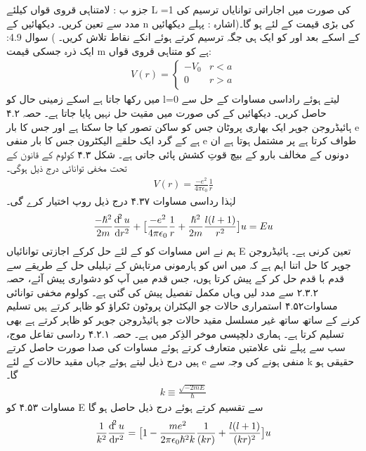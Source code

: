 جزو ب : لامتناہی قروی قواں کیلئے L =1 کی صورت میں اجاراتی توانایاں ترسیم کی مدد سے تعین کریں۔ دیکھائیں کے n کی بڑی قیمت کے لئے 
ہو گا۔(اشارہ : پہلے دیکھائیں کے
اسکے بعد
اور
کو ایک ہی جگہ ترسیم کرتے ہوئے انکے نقاط تلاش کریں۔ )
سوال 4.9: ایک ذرہ جسکی قیمت m ہے کو متناہی قروی قواں:
\begin{align}
V(r)=\begin{cases}-V_{0}&r<a\\0&r>a\\\end{cases} 
\end{align}
میں رکھا جاتا ہے اسکے زمینی حال کو l=0 لیتے ہوئے راداسی مساوات کے حل سے حاصل کریں۔ دیکھائیں کے
کی صورت میں مقیت حل نہیں پایا جاتا ہے۔
حصہ ۴.۲
ہائیڈروجن جوہر ایک بھاری پروٹان جس کو ساکن تصور کیا جا سکتا ہے اور جس کا بار e ہے کے  گرد ایک حلقے الیکٹرون جس کا بار منفی e طواف کرتا ہے پر مشتمل ہوتا ہے ان دونوں کے مخالف بارو کے بیچ قوتِ کشش پائی جاتی ہے۔
 شکل ۴.۳
 کولوم کے قانون کے تحت مخفی توانائی درج ذیل ہوگی۔  
 \begin{align}
V(r)=\frac{-e^{2}}{4\pi\epsilon_{0}}\frac{1}{r} 
\end{align}
لہٰذا رداسی مساوات ۴.۳۷ درج ذیل روپ اختیار کرے گی۔
\begin{align}
\frac{-\hslash^{2}}{2m}\frac{\dif^{2}{u}}{\dif{r^{2}}}+\big[\frac{-e^{2}}{4\pi\epsilon_{0}}\frac{1}{r}+\frac{\hslash^{2}}{2m}\frac{l(l+1)}{r^{2}}\big]u=Eu 
\end{align}
 ہم نے اس مساوات کو 
  کے لئے حل کرکے اجازتی توانائیاں E تعین کرنی ہے۔  ہائیڈروجن جوہر کا حل اتنا اہم ہے کہ میں اس کو ہارمونی مرتاہش کے تہلیلی حل کے طریقے سے قدم با قدم حل کر کے پیش کرتا ہوں، جس قدم میں آپ کو دشواری پیش آئے، حصہ ۲.۳.۲ سے مدد لیں وہاں مکمل تفصیل پیش کی گئی ہے۔ کولوم مخفی توانائی مساوات۴.۵۲ 
 استمراری حالات جو الیکٹران پروٹون ٹکراؤ کو ظاہر کرتے ہیں تسلیم کرنے کے ساتھ ساتھ غیر مسلسل مقید حالات جو ہائیڈروجن جوہر کو ظاہر کرتے ہے بھی تسلیم کرتا ہے۔ ہماری دلچپسی موخر الذِکر میں ہے۔
 حصہ ۴.۲.۱
 رداسی تفاعل موج، سب سے پہلے نئی علامتیں متعارف کرتے ہوئے مساوات کی صدا صورت حاصل کرتے ہیں درج ذیل لیتے ہوئے جہاں مقید حالات کے لئے e منفی ہونے کی وجہ سے k  حقیقی ہو گا۔
 \begin{align}
k\equiv \frac{\sqrt{-2mE}}{\hslash} 
\end{align}
 مساوات ۴.۵۳ کو E سے تقسیم کرتے ہوئے درج ذیل حاصل ہو گا
\begin{align}
\frac{1}{k^{2}}\frac{\dif^{2}{u}}{\dif{r^{2}}}=\big[1-\frac{me^{2}}{2\pi\epsilon_{0}\hslash^{2}k}\frac{1}{(kr)}+\frac{l(l+1)}{(kr)^{2}}\big]u 
\end{align}
